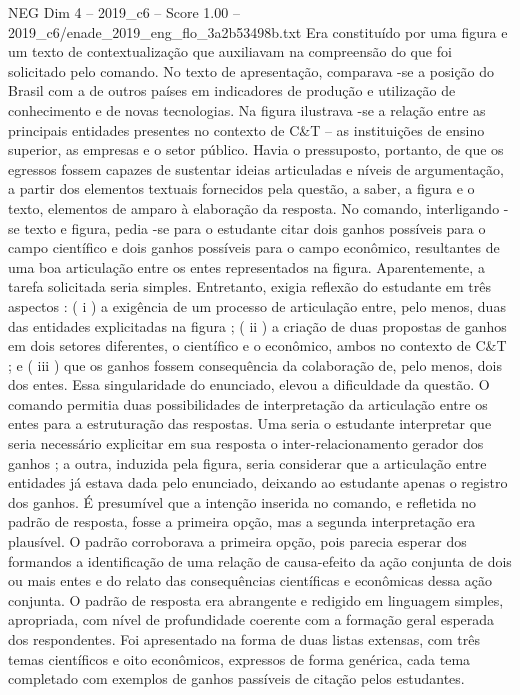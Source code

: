 \begin{textsample}{NEG Dim 4 – 2019\_c6 – Score 1.00 – 2019\_c6/enade\_2019\_eng\_flo\_3a2b53498b.txt}
Era constituído por uma figura e um texto de contextualização que auxiliavam na compreensão do que foi solicitado pelo comando.
No texto de apresentação, comparava -se a posição do Brasil com a de outros países em indicadores de produção e utilização de conhecimento e de novas tecnologias.
Na figura ilustrava -se a relação entre as principais entidades presentes no contexto de C\&T – as instituições de ensino superior, as empresas e o setor público.
Havia o pressuposto, portanto, de que os egressos fossem capazes de sustentar ideias articuladas e níveis de argumentação, a partir dos elementos textuais fornecidos pela questão, a saber, a figura e o texto, elementos de amparo à elaboração da resposta.
No comando, interligando -se texto e figura, pedia -se para o estudante citar dois ganhos possíveis para o campo científico e dois ganhos possíveis para o campo econômico, resultantes de uma boa articulação entre os entes representados na figura.
Aparentemente, a tarefa solicitada seria simples.
Entretanto, exigia reflexão do estudante em três aspectos : ( i ) a exigência de um processo de articulação entre, pelo menos, duas das entidades explicitadas na figura ; ( ii ) a criação de duas propostas de ganhos em dois setores diferentes, o científico e o econômico, ambos no contexto de C\&T ; e ( iii ) que os ganhos fossem consequência da colaboração de, pelo menos, dois dos entes.
Essa singularidade do enunciado, elevou a dificuldade da questão.
O comando permitia duas possibilidades de interpretação da articulação entre os entes para a estruturação das respostas.
Uma seria o estudante interpretar que seria necessário explicitar em sua resposta o inter-relacionamento gerador dos ganhos ; a outra, induzida pela figura, seria considerar que a articulação entre entidades já estava dada pelo enunciado, deixando ao estudante apenas o registro dos ganhos.
É presumível que a intenção inserida no comando, e refletida no padrão de resposta, fosse a primeira opção, mas a segunda interpretação era plausível.
O padrão corroborava a primeira opção, pois parecia esperar dos formandos a identificação de uma relação de causa-efeito da ação conjunta de dois ou mais entes e do relato das consequências científicas e econômicas dessa ação conjunta.
O padrão de resposta era abrangente e redigido em linguagem simples, apropriada, com nível de profundidade coerente com a formação geral esperada dos respondentes.
Foi apresentado na forma de duas listas extensas, com três temas científicos e oito econômicos, expressos de forma genérica, cada tema completado com exemplos de ganhos passíveis de citação pelos estudantes.

\end{textsample}
